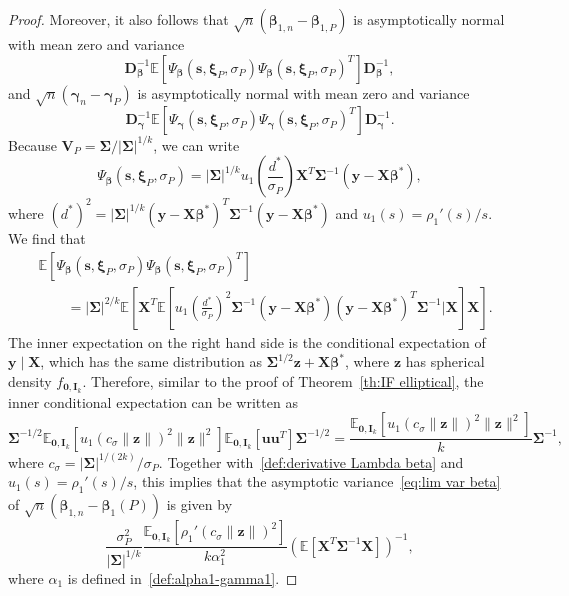 \documentclass{article}
\numberwithin{equation}{section}
\theoremstyle{plain}
\newcommand{\bbeta}{\bm\beta}
\newcommand{\bxi}{\bm\xi}
\newcommand{\bgamma}{\bm\gamma}
\newcommand{\bSigma}{\mathbf{\Sigma}}
\newcommand{\by}{\mathbf{y}}
\newcommand{\bu}{\mathbf{u}}
\newcommand{\bz}{\mathbf{z}}
\newcommand{\bX}{\mathbf{X}}
\newcommand{\bV}{\mathbf{V}}
\newcommand{\bI}{\mathbf{I}}
\newcommand{\bD}{\mathbf{D}}
\newcommand{\E}{\mathbb{E}}
\begin{document}
\begin{proof}
Moreover, it also follows that $\sqrt{n}(\bbeta_{1,n}-\bbeta_{1,P})$ is asymptotically normal with
mean zero and variance
\begin{equation}
\label{eq:lim var beta}
\bD_{\bbeta}^{-1}\E[\Psi_{\bbeta}(\mathbf{s},\bxi_P,\sigma_P)\Psi_{\bbeta}(\mathbf{s},\bxi_P,\sigma_P)^T]\bD_{\bbeta}^{-1},
\end{equation}
and $\sqrt{n}(\bgamma_n-\bgamma_P)$ is asymptotically normal with mean zero and variance
\begin{equation}
\label{eq:lim var gamma}
\bD_{\bgamma}^{-1}\E[\Psi_{\bgamma}(\mathbf{s},\bxi_P,\sigma_P)\Psi_{\bgamma}(\mathbf{s},\bxi_P,\sigma_P)^T]\bD_{\bgamma}^{-1}.
\end{equation}
Because $\bV_P=\bSigma/|\bSigma|^{1/k}$,
we can write
\[
\Psi_{\bbeta}(\mathbf{s},\bxi_P,\sigma_P)
=
|\bSigma|^{1/k}
u_1\left(\frac{d^*}{\sigma_P}\right)
\bX^T\bSigma^{-1}(\by-\bX\bbeta^*),
\]
where $(d^*)^2=|\bSigma|^{1/k}(\by-\bX\bbeta^*)^T\bSigma^{-1}(\by-\bX\bbeta^*)$ and
$u_1(s)=\rho_1'(s)/s$.
We find that
\[
\begin{split}
&
\E\left[
\Psi_{\bbeta}(\mathbf{s},\bxi_P,\sigma_P)
\Psi_{\bbeta}(\mathbf{s},\bxi_P,\sigma_P)^T
\right]\\
&\qquad=
|\bSigma|^{2/k}
\E\left[
\bX^T
\E\left[
u_1\left(\frac{d^*}{\sigma_P}\right)^2
\bSigma^{-1}
(\by-\bX\bbeta^*)(\by-\bX\bbeta^*)^T
\bSigma^{-1}
\bigg|
\bX
\right]
\bX
\right].
\end{split}
\]
The inner expectation on the right hand side
is the conditional expectation of $\by\mid\bX$,
which has the same distribution as 
$\bSigma^{1/2}\bz+\bX\bbeta^*$, where $\bz$ has spherical density $f_{\mathbf{0},\bI_k}$.
Therefore, 
similar to the proof of Theorem~\ref{th:IF elliptical},
the inner conditional expectation can be written as
\[
\bSigma^{-1/2}
\E_{\mathbf{0},\bI_k}\left[u_1(c_\sigma\|\bz\|)^2\|\bz\|^2\right]
\E_{\mathbf{0},\bI_k}
\left[\bu\bu^T\right]
\bSigma^{-1/2}
=
\frac{\E_{\mathbf{0},\bI_k}\left[u_1(c_\sigma\|\bz\|)^2\|\bz\|^2\right]}{k}
\bSigma^{-1},
\]
where $c_\sigma=|\bSigma|^{1/(2k)}/\sigma_P$.
Together with~\eqref{def:derivative Lambda beta} 
and $u_1(s)=\rho_1'(s)/s$,
this implies that
the asymptotic variance~\eqref{eq:lim var beta} of $\sqrt{n}(\bbeta_{1,n}-\bbeta_1(P))$ is given by
\[
\frac{\sigma_P^2}{|\bSigma|^{1/k}}
\frac{\E_{\mathbf{0},\bI_k}\left[\rho_1'(c_\sigma\|\bz\|)^2\right]}{k\alpha_1^2}
\left(
\mathbb{E}\left[\mathbf{X}^T\bSigma^{-1}\mathbf{X}\right]
\right)^{-1},
\]
where $\alpha_1$ is defined in~\eqref{def:alpha1-gamma1}.


\end{proof}
\end{document}

